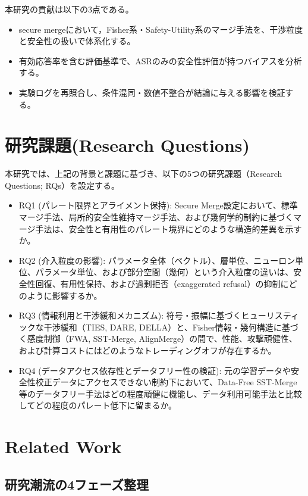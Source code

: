 \documentclass{article}
\begin{document}
本研究の貢献は以下の3点である。

\begin{itemize}
\item  secure mergeにおいて，Fisher系・Safety-Utility系のマージ手法を、干渉粒度と安全性の扱いで体系化する。
\item  有効応答率を含む評価基準で、ASRのみの安全性評価が持つバイアスを分析する。
\item  実験ログを再照合し、条件混同・数値不整合が結論に与える影響を検証する。
\end{itemize}


\section{研究課題(Research Questions)}
\label{gen_inst}
本研究では、上記の背景と課題に基づき、以下の5つの研究課題（Research Questions; RQs）を設定する。

\begin{itemize}
\item RQ1 (パレート限界とアライメント保持): Secure Merge設定において、標準マージ手法、局所的安全性維持マージ手法、および幾何学的制約に基づくマージ手法は、安全性と有用性のパレート境界にどのような構造的差異を示すか。
\item RQ2 (介入粒度の影響): パラメータ全体（ベクトル）、層単位、ニューロン単位、パラメータ単位、および部分空間（幾何）という介入粒度の違いは、安全性回復、有用性保持、および過剰拒否（exaggerated refusal）の抑制にどのように影響するか。
\item RQ3 (情報利用と干渉緩和メカニズム): 符号・振幅に基づくヒューリスティックな干渉緩和（TIES, DARE, DELLA）と、Fisher情報・幾何構造に基づく感度制御（FWA, SST-Merge, AlignMerge）の間で、性能、攻撃頑健性、および計算コストにはどのようなトレーディングオフが存在するか。
\item RQ4 (データアクセス依存性とデータフリー性の検証): 元の学習データや安全性校正データにアクセスできない制約下において、Data-Free SST-Merge等のデータフリー手法はどの程度頑健に機能し、データ利用可能手法と比較してどの程度のパレート低下に留まるか。
\end{itemize}

\section{Related Work}

\subsection{研究潮流の4フェーズ整理}
\end{document}
